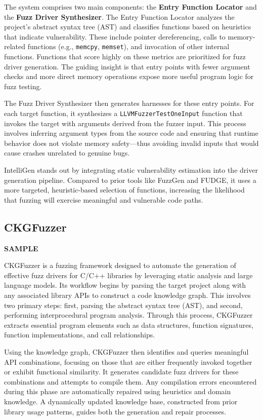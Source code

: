 \documentclass[
  a4paper,
  DIV=11,
  numbers=noendperiod]{scrreprt}
\theoremstyle{definition}
\theoremstyle{remark}
\begin{document}
The system comprises two main components: the \textbf{Entry Function
Locator} and the \textbf{Fuzz Driver Synthesizer}. The Entry Function
Locator analyzes the project's abstract syntax tree (AST) and classifies
functions based on heuristics that indicate vulnerability. These include
pointer dereferencing, calls to memory-related functions (e.g.,
\texttt{memcpy}, \texttt{memset}), and invocation of other internal
functions. Functions that score highly on these metrics are prioritized
for fuzz driver generation. The guiding insight is that entry points
with fewer argument checks and more direct memory operations expose more
useful program logic for fuzz testing.

The Fuzz Driver Synthesizer then generates harnesses for these entry
points. For each target function, it synthesizes a
\texttt{LLVMFuzzerTestOneInput} function that invokes the target with
arguments derived from the fuzzer input. This process involves inferring
argument types from the source code and ensuring that runtime behavior
does not violate memory safety---thus avoiding invalid inputs that would
cause crashes unrelated to genuine bugs.

IntelliGen stands out by integrating static vulnerability estimation
into the driver generation pipeline. Compared to prior tools like
FuzzGen and FUDGE, it uses a more targeted, heuristic-based selection of
functions, increasing the likelihood that fuzzing will exercise
meaningful and vulnerable code paths.

\subsection{CKGFuzzer}\label{ckgfuzzer}

\textbf{SAMPLE}

CKGFuzzer \autocite{xu2024} is a fuzzing framework designed to automate
the generation of effective fuzz drivers for C/C++ libraries by
leveraging static analysis and large language models. Its workflow
begins by parsing the target project along with any associated library
APIs to construct a code knowledge graph. This involves two primary
steps: first, parsing the abstract syntax tree (AST), and second,
performing interprocedural program analysis. Through this process,
CKGFuzzer extracts essential program elements such as data structures,
function signatures, function implementations, and call relationships.

Using the knowledge graph, CKGFuzzer then identifies and queries
meaningful API combinations, focusing on those that are either
frequently invoked together or exhibit functional similarity. It
generates candidate fuzz drivers for these combinations and attempts to
compile them. Any compilation errors encountered during this phase are
automatically repaired using heuristics and domain knowledge. A
dynamically updated knowledge base, constructed from prior library usage
patterns, guides both the generation and repair processes.
\end{document}
